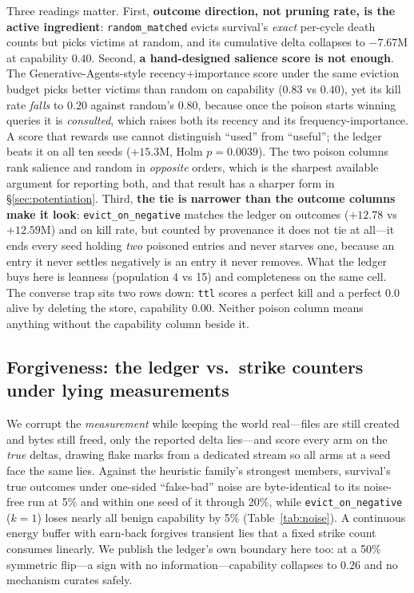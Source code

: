 Three readings matter. First, \textbf{outcome direction, not pruning
rate, is the active ingredient}: \texttt{random\_matched} evicts
survival's \emph{exact} per-cycle death counts but picks victims at
random, and its cumulative delta collapses to $-7.67$M at capability
$0.40$. Second, \textbf{a hand-designed salience score is not enough}.
The Generative-Agents-style recency$+$importance score under the same
eviction budget picks better victims than random on capability ($0.83$ vs
$0.40$), yet its kill rate \emph{falls} to $0.20$ against random's
$0.80$, because once the poison starts winning queries it is
\emph{consulted}, which raises both its recency and its
frequency-importance. A score that rewards use cannot distinguish
``used'' from ``useful''; the ledger beats it on all ten seeds ($+15.3$M,
Holm $p = 0.0039$). The two poison columns rank salience and random in
\emph{opposite} orders, which is the sharpest available argument for
reporting both, and that result has a sharper form in
\S\ref{sec:potentiation}. Third, \textbf{the tie is narrower than the
outcome columns make it look}: \texttt{evict\_on\_negative} matches the
ledger on outcomes ($+12.78$ vs $+12.59$M) and on kill rate, but counted
by provenance it does not tie at all---it ends every seed holding
\emph{two} poisoned entries and never starves one, because an entry it
never settles negatively is an entry it never removes. What the ledger
buys here is leanness (population 4 vs 15) and completeness on the same
cell. The converse trap sits two rows down: \texttt{ttl} scores a perfect
kill and a perfect $0.0$ alive by deleting the store, capability $0.00$.
Neither poison column means anything without the capability column beside
it.

\subsection{Forgiveness: the ledger vs.\ strike counters under lying measurements}
We corrupt the \emph{measurement} while keeping the world real---files are
still created and bytes still freed, only the reported delta lies---and
score every arm on the \emph{true} deltas, drawing flake marks from a
dedicated stream so all arms at a seed face the same lies. Against the
heuristic family's strongest members, survival's true outcomes under
one-sided ``false-bad'' noise are byte-identical to its noise-free run at
5\% and within one seed of it through 20\%, while
\texttt{evict\_on\_negative} ($k{=}1$) loses nearly all benign capability
by 5\% (Table~\ref{tab:noise}). A continuous energy buffer with earn-back
forgives transient lies that a fixed strike count consumes linearly. We
publish the ledger's own boundary here too: at a 50\% symmetric flip---a
sign with no information---capability collapses to $0.26$ and no
mechanism curates safely.

